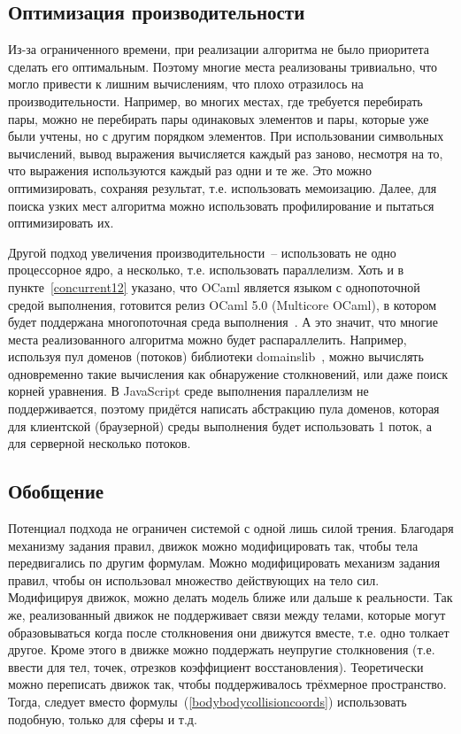 \subsection{Оптимизация производительности}\label{optimization}

Из-за ограниченного времени, при реализации алгоритма не было приоритета сделать его оптимальным.
Поэтому многие места реализованы тривиально, что могло привести к лишним вычислениям, что плохо отразилось на производительности.
Например, во многих местах, где требуется перебирать пары,
можно не перебирать пары одинаковых элементов и пары, которые уже были учтены, но с другим порядком элементов.
При использовании символьных вычислений, вывод выражения вычисляется каждый раз заново, несмотря на то, что выражения используются каждый раз одни и те же.
Это можно оптимизировать, сохраняя результат, т.е. использовать мемоизацию.
Далее, для поиска узких мест алгоритма можно использовать профилирование и пытаться оптимизировать их.

Другой подход увеличения производительности~-- использовать не одно процессорное ядро, а несколько, т.е. использовать параллелизм.
Хоть и в пункте~\ref{concurrent12} указано, что OCaml является языком с однопоточной средой выполнения,
готовится релиз OCaml 5.0 (Multicore OCaml), в котором будет поддержана многопоточная среда выполнения~\cite{infoqmulticore}.
А это значит, что многие места реализованного алгоритма можно будет распараллелить.
Например, используя пул доменов (потоков) библиотеки domainslib~\cite{domainslibgithub},
можно вычислять одновременно такие вычисления как обнаружение столкновений, или даже поиск корней уравнения.
В JavaScript среде выполнения параллелизм не поддерживается, поэтому придётся написать абстракцию пула доменов,
которая для клиентской (браузерной) среды выполнения будет использовать 1 поток, а для серверной несколько потоков.

\subsection{Обобщение}

Потенциал подхода не ограничен системой с одной лишь силой трения.
Благодаря механизму задания правил, движок можно модифицировать так, чтобы тела передвигались по другим формулам.
Можно модифицировать механизм задания правил, чтобы он использовал множество действующих на тело сил.
Модифицируя движок, можно делать модель ближе или дальше к реальности.
Так же, реализованный движок не поддерживает связи между телами, которые
могут образовываться когда после столкновения они движутся вместе, т.е. одно толкает другое.
Кроме этого в движке можно поддержать неупругие столкновения (т.е. ввести для тел, точек, отрезков коэффициент восстановления).
Теоретически можно переписать движок так, чтобы поддерживалось трёхмерное пространство.
Тогда, следует вместо формулы~(\ref{bodybodycollisioncoords}) использовать подобную, только для сферы и т.д.


